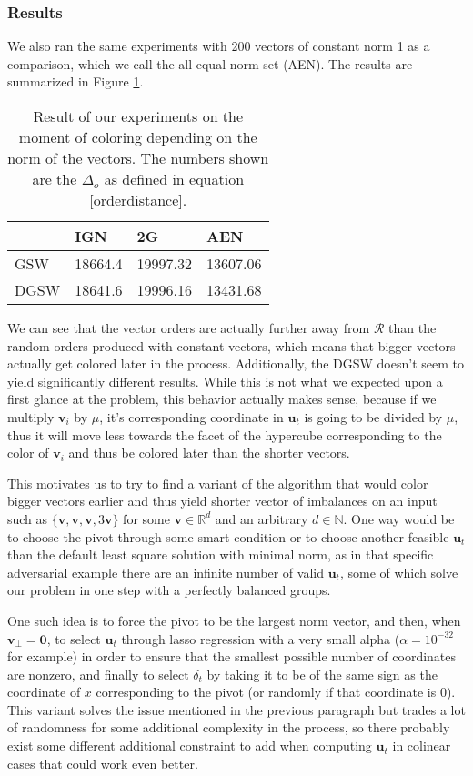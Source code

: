 \documentclass[12pt]{article}
\begin{document}
\subsubsection{Results}\label{results_norm_affect_when}
We also ran the same experiments with 200 vectors of constant norm 1 as a comparison, which we call the all equal norm set (AEN). The results are summarized in Figure \ref{norm_when_colored}.
\begin{table}[h!]
\centering
\caption{Result of our experiments on the moment of coloring depending on the norm of the vectors. The numbers shown are the $\Delta_o$ as defined in equation \ref{orderdistance}.}
\begin{tabular}{l|lll}
& IGN & 2G & AEN  \\
\hline
GSW & 18664.4 & 19997.32 & 13607.06 \\
DGSW & 18641.6 & 19996.16 & 13431.68
\end{tabular}
\label{norm_when_colored}
\end{table}

We can see that the vector orders are actually further away from $\mathcal{R}$ than the random orders produced with constant vectors, which means that bigger vectors actually get colored later in the process. Additionally, the DGSW doesn't seem to yield significantly different results. While this is not what we expected upon a first glance at the problem, this behavior actually makes sense, because if we multiply $\textbf{v}_i$ by $\mu%
$, it's corresponding coordinate in $\textbf{u}_t$ is going to be divided by $\mu$, thus it will move less towards the facet of the hypercube corresponding to the color of $\textbf{v}_i$ and thus be colored later than the shorter vectors.

This motivates us to try to find a variant of the algorithm that would color bigger vectors earlier and thus yield shorter vector of imbalances on an input such as $\{\textbf{v},\textbf{v},\textbf{v},3\textbf{v}\}$ for some $\textbf{v}\in\mathbb{R}^d$ and an arbitrary $d\in\mathbb{N}$. One way would be to choose the pivot through some smart condition or to choose another feasible $\textbf{u}_t$ than the default least square solution with minimal norm, as in that specific adversarial example there are an infinite number of valid $\textbf{u}_t$, some of which solve our problem in one step with a perfectly balanced groups.

One such idea is to force the pivot to be the largest norm vector, and then, when $\textbf{v}_\perp=\textbf{0}$, to select $\textbf{u}_t$ through lasso regression with a very small alpha ($\alpha=10^{-32}$ for example) in order to ensure that the smallest possible number of coordinates are nonzero, and finally to select $\delta_t$ by taking it to be of the same sign as the coordinate of $x$ corresponding to the pivot (or randomly if that coordinate is 0). This variant solves the issue mentioned in the previous paragraph but trades a lot of randomness for some additional complexity in the process, so there probably exist some different additional constraint to add when computing $\textbf{u}_t$ in colinear cases that could work even better.
\end{document}
